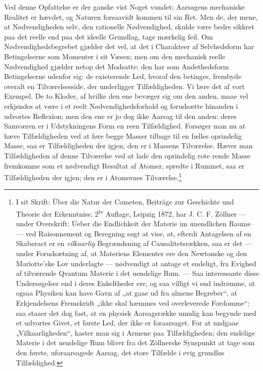 \documentclass[12pt,a4paper]{book}
\begin{document}
Ved denne Opfattelse er der ganske vist Noget vundet; Aarsagens
mechaniske Realitet er hævdet, og Naturen forsaavidt kommen til sin
Ret. Men de, der mene, at Nødvendigheden selv, den rationelle
Nødvendighed, skulde være bedre sikkret paa det reelle end paa det
ideelle Grundlag, tage mærkelig feil. Om Nødvendighedsbegrebet gjælder
det vel, at det i Charakteer af Selvhedsform har Betingelserne som
Momenter i sit Væsen; men om den mechanisk reelle Nødvendighed gjælder
netop det Modsatte; den har som Andethedsform Betingelserne udenfor
sig: de existerende Led, hvoraf den betinges, frembyde overalt en
Tilværelsesside, der underligger Tilfældigheden. Vi lære det af vort
Exempel. De to Kloder, af hvilke den ene bevæger sig om den anden, maae
vel erkjendes at være i et reelt Nødvendighedsforhold og forudsætte
hinanden i udvortes Reflexion; men den ene er jo dog ikke Aarsag til
den anden: deres Samværen er i Udstykningens Form en reen
Tilfældighed. Forsøger man nu at hæve Tilfældigheden ved at føre begge
Masser tilbage til en fælles oprindelig Masse, saa er Tilfældigheden
der igjen; den er i Massens Tilværelse. Hæver man Tilfældigheden af
denne Tilværelse ved at lade den oprindelig rote\-%
rende Masse fremkomme som et nødvendigt Resultat af Atomer, spredte i
Rummet, saa er Tilfældigheden der igjen; den er i Atomernes
Tilværelse.\footnote{%
I sit Skrift: Über die Natur der Cometen, Beiträge zur Geschichte und
Theorie der Erkenntniss; 2\textsuperscript{te} Auflage, Leipzig 1872,
har J. C. F. Zöllner --- under Overskrift: Ueber die Endlichkeit der
Materie im unendlichen Raume --- ved Raisonnement og Beregning søgt at
vise, at, efterdi Antagelsen af en Skaberact er en \emph{vilkaarlig}
Begrændsning af Causalitetsrækken, saa er det --- under Forudsætning
af, at Materiens Elementer ere den Newtonske og den Mariotte'ske Lov
underlagte --- nødvendigt at antage et endeligt, fra Evighed af
tilværende Qvantum Materie i det uendelige Rum. --- Saa interessante
disse Undersøgelser end i deres Enkeltheder ere, og saa villigt vi end
indrømme, at ogsaa Physiken kan have Gavn af „at gaae ud fra almene
Begreber“, at Erkjendelsens Fremskridt „ikke skal hæmmes ved
overleverede Fordomme“: saa staaer det dog fast, at en physisk
Aarsagsrække umulig kan begynde med et udvortes Givet, et første Led,
der ikke er foraarsaget. For at undgaae „Vilkaarligheden“, kaster man
sig i Armene paa Tilfældigheden; den endelige Materie i det uendelige
Rum bliver fra det Zöllnerske Synspunkt at tage som den første,
uforaarsagede Aarsag, det store Tilfælde i evig grundløs
Tilfældighed.}
\end{document}
